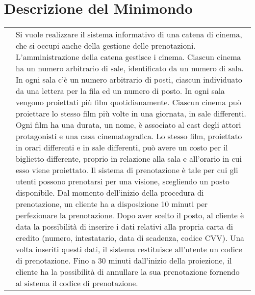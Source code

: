 \section{Descrizione del Minimondo}

\begin{tabularx}{\linewidth}{r|>{\internallinenumbers}X|}
    \cline{2-2} &
    Si vuole realizzare il sistema informativo di una catena di cinema,
    che si occupi anche della gestione delle prenotazioni.
    \newline
    \newline
    L’amministrazione della catena gestisce i cinema.
    Ciascun cinema ha un numero arbitrario di sale, identificato da un
    numero di sala.
    In ogni sala c’è un numero arbitrario di posti, ciascun individuato
    da una lettera per la fila ed un numero di posto.
    \newline
    \newline
    In ogni sala vengono proiettati più film quotidianamente.
    Ciascun cinema può proiettare lo stesso film più volte in una giornata,
    in sale differenti. Ogni film ha una durata, un nome, è associato
    al cast degli attori protagonisti e una casa cinematografica.
    Lo stesso film, proiettato in orari differenti e in sale differenti,
    può avere un costo per il biglietto differente, proprio in relazione
    alla sala e all’orario in cui esso viene proiettato.
    \newline
    \newline
    Il sistema di prenotazione è tale per cui gli utenti possono prenotarsi
    per una visione, scegliendo un posto disponibile. Dal momento dell’inizio
    della procedura di prenotazione, un cliente ha a disposizione 10 minuti
    per perfezionare la prenotazione.
    Dopo aver scelto il  posto, al cliente è data la possibilità di inserire
    i dati relativi alla propria carta di credito
    (numero, intestatario, data di scadenza, codice CVV).
    Una volta inseriti questi dati, il sistema restituisce all’utente
    un codice di prenotazione.
    Fino a 30 minuti dall'inizio della proiezione, il cliente ha la possibilità
    di annullare la sua prenotazione fornendo al sistema il codice
    di prenotazione.
    \newline
    \newline

\end{tabularx}
